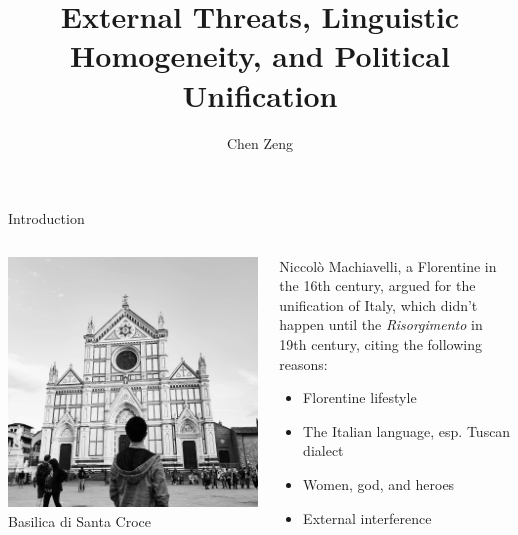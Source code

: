 \documentclass{beamer}
\title[Necessary Conditions of Political Unification]{External Threats, Linguistic Homogeneity, and Political Unification}
\author{Chen Zeng}
\institute[]{Department of Political Science \\ Renmin University of China}
\begin{document}
	\maketitle
	\begin{frame}{Introduction}
		\begin{columns}
			\begin{column}{.4\textwidth}
				\includegraphics[width=\textwidth]{santa_croce.jpg}
				\scriptsize
				\centering
				Basilica di Santa Croce
			\end{column}
			\begin{column}{.6\textwidth}
				Niccolò Machiavelli, a Florentine in the 16th century, argued for the unification of Italy, which didn't happen until the \textit{Risorgimento} in 19th century, citing the following reasons:
				\begin{itemize}
					\item Florentine lifestyle
					\item The Italian language, esp. Tuscan dialect
					\item Women, god, and heroes
					\item External interference
				\end{itemize}
			\end{column}
		\end{columns}
	\end{frame}
\end{document}
